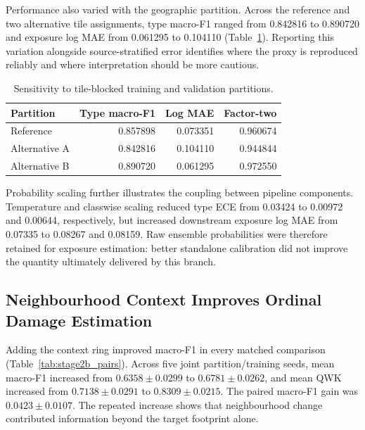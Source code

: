 Performance also varied with the geographic partition. Across the reference and two alternative tile assignments, type macro-F1 ranged from 0.842816 to 0.890720 and exposure log MAE from 0.061295 to 0.104110 (Table~\ref{tab:stage2a_splits}). Reporting this variation alongside source-stratified error identifies where the proxy is reproduced reliably and where interpretation should be more cautious.

\begin{table}[t]
\centering
\caption{Sensitivity to tile-blocked training and validation partitions.}
\label{tab:stage2a_splits}
\small
\begin{tabular}{lrrr}
\toprule
Partition & Type macro-F1 & Log MAE & Factor-two \\
\midrule
Reference & 0.857898 & 0.073351 & 0.960674 \\
Alternative A & 0.842816 & 0.104110 & 0.944844 \\
Alternative B & 0.890720 & 0.061295 & 0.972550 \\
\bottomrule
\end{tabular}
\end{table}

Probability scaling further illustrates the coupling between pipeline components. Temperature and classwise scaling reduced type ECE from 0.03424 to 0.00972 and 0.00644, respectively, but increased downstream exposure log MAE from 0.07335 to 0.08267 and 0.08159. Raw ensemble probabilities were therefore retained for exposure estimation: better standalone calibration did not improve the quantity ultimately delivered by this branch.


\subsection{Neighbourhood Context Improves Ordinal Damage Estimation}
\label{sec:exp_stage2b}

Adding the context ring improved macro-F1 in every matched comparison (Table~\ref{tab:stage2b_pairs}). Across five joint partition/training seeds, mean macro-F1 increased from $0.6358\pm0.0299$ to $0.6781\pm0.0262$, and mean QWK increased from $0.7138\pm0.0291$ to $0.8309\pm0.0215$. The paired macro-F1 gain was $0.0423\pm0.0107$. The repeated increase shows that neighbourhood change contributed information beyond the target footprint alone.

